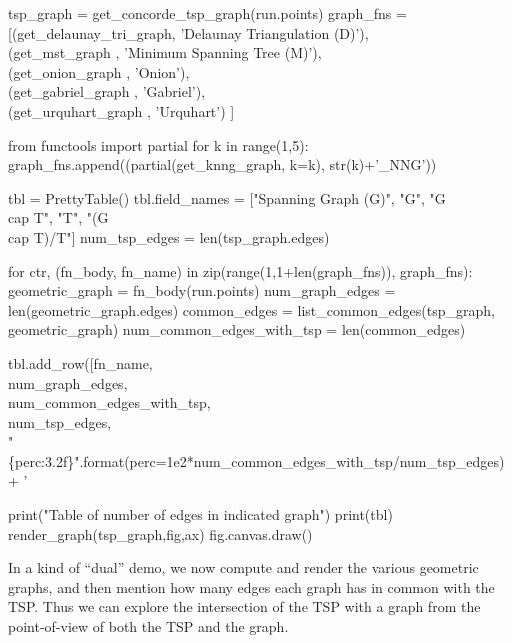 \nwenddocs{}\endmoddef\nwstartdeflinemarkup{}\nwenddeflinemarkup
tsp_graph = get_concorde_tsp_graph(run.points)
graph_fns = [(get_delaunay_tri_graph, 'Delaunay Triangulation (D)'), \\
             (get_mst_graph         , 'Minimum Spanning Tree (M)'), \\
             (get_onion_graph       , 'Onion'),\\
             (get_gabriel_graph     , 'Gabriel'),\\
             (get_urquhart_graph    , 'Urquhart') ]

from functools import partial
for k in range(1,5): 
   graph_fns.append((partial(get_knng_graph, k=k), str(k)+'_NNG'))

tbl             = PrettyTable()
tbl.field_names = ["Spanning Graph (G)", "G", "G \\cap T", "T", "(G \\cap T)/T"]
num_tsp_edges   = len(tsp_graph.edges)

for ctr, (fn_body, fn_name) in zip(range(1,1+len(graph_fns)), graph_fns):
     geometric_graph = fn_body(run.points)
     num_graph_edges = len(geometric_graph.edges)
     common_edges    = list_common_edges(tsp_graph, geometric_graph)
     num_common_edges_with_tsp = len(common_edges)

     tbl.add_row([fn_name,                 \\
                num_graph_edges,           \\
                num_common_edges_with_tsp, \\
                num_tsp_edges,             \\
                "\{perc:3.2f\}".format(perc=1e2*num_common_edges_with_tsp/num_tsp_edges)+ ' %
                
print("Table of number of edges in indicated graph")
print(tbl)
render_graph(tsp_graph,fig,ax)
fig.canvas.draw()
\nwendcode{}\nwdocspar

In a kind of ``dual'' demo, we now compute and render the various geometric graphs, and then mention how many 
edges each graph has in common with the TSP. Thus we can explore the intersection of the TSP with a graph
from the point-of-view of both the TSP and the graph. 

